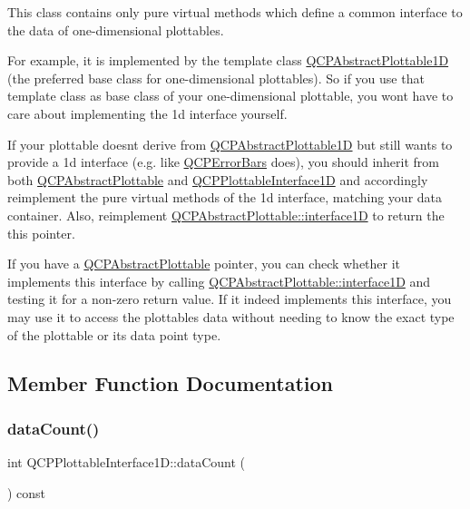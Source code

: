 This class contains only pure virtual methods which define a common interface to the data of one-\/dimensional plottables.

For example, it is implemented by the template class \mbox{\hyperlink{class_q_c_p_abstract_plottable1_d}{Q\+C\+P\+Abstract\+Plottable1D}} (the preferred base class for one-\/dimensional plottables). So if you use that template class as base class of your one-\/dimensional plottable, you won\textquotesingle{}t have to care about implementing the 1d interface yourself.

If your plottable doesn\textquotesingle{}t derive from \mbox{\hyperlink{class_q_c_p_abstract_plottable1_d}{Q\+C\+P\+Abstract\+Plottable1D}} but still wants to provide a 1d interface (e.\+g. like \mbox{\hyperlink{class_q_c_p_error_bars}{Q\+C\+P\+Error\+Bars}} does), you should inherit from both \mbox{\hyperlink{class_q_c_p_abstract_plottable}{Q\+C\+P\+Abstract\+Plottable}} and \mbox{\hyperlink{class_q_c_p_plottable_interface1_d}{Q\+C\+P\+Plottable\+Interface1D}} and accordingly reimplement the pure virtual methods of the 1d interface, matching your data container. Also, reimplement \mbox{\hyperlink{class_q_c_p_abstract_plottable_a81fd9fd5c4f429c074785e2eb238a8e7}{Q\+C\+P\+Abstract\+Plottable\+::interface1D}} to return the {\ttfamily this} pointer.

If you have a \mbox{\hyperlink{class_q_c_p_abstract_plottable}{Q\+C\+P\+Abstract\+Plottable}} pointer, you can check whether it implements this interface by calling \mbox{\hyperlink{class_q_c_p_abstract_plottable_a81fd9fd5c4f429c074785e2eb238a8e7}{Q\+C\+P\+Abstract\+Plottable\+::interface1D}} and testing it for a non-\/zero return value. If it indeed implements this interface, you may use it to access the plottable\textquotesingle{}s data without needing to know the exact type of the plottable or its data point type. 

\subsection{Member Function Documentation}
\mbox{\label{class_q_c_p_plottable_interface1_d_a058a22c770ef4d5a0e878a7f02183da9}} 
\subsubsection{\texorpdfstring{data\+Count()}{dataCount()}}
{\footnotesize\ttfamily int Q\+C\+P\+Plottable\+Interface1\+D\+::data\+Count (\begin{DoxyParamCaption}{ }\end{DoxyParamCaption}) const\hspace{0.3cm}{\ttfamily [pure virtual]}}


